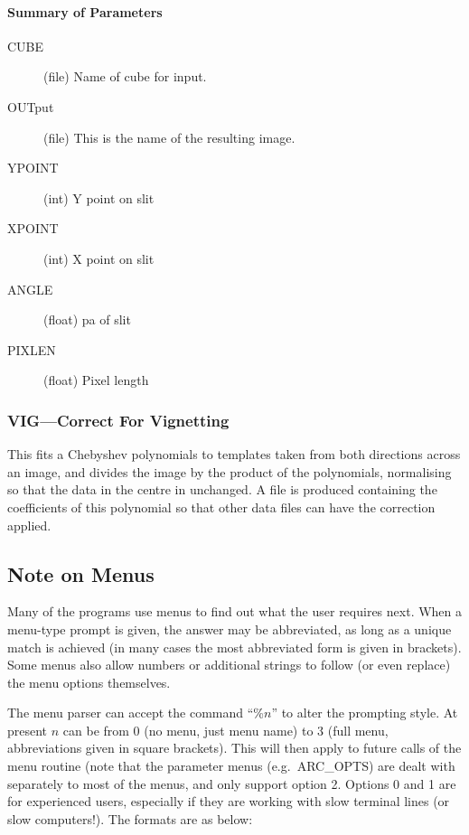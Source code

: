 \paragraph{Summary of Parameters}

\begin{description}
\item[CUBE] (file) Name of cube for input.
\item[OUTput] (file) This is the name of the resulting image.
\item[YPOINT] (int) Y point on slit
\item[XPOINT] (int) X point on slit
\item[ANGLE] (float) pa of slit
\item[PIXLEN] (float) Pixel length
\end{description}

\subsubsection{VIG---Correct For Vignetting}

This fits a Chebyshev polynomials to templates taken from both
directions across an image, and divides the image by the product of the
polynomials, normalising so that the data in the centre in unchanged.
A file is produced containing the coefficients of this polynomial so that
other data files can have the correction applied.

\clearpage

\subsection{\label{note_on_menus}Note on Menus}

Many of the programs use menus to find out what the user requires next.
When a menu-type prompt is given, the answer may be abbreviated, as long
as a unique match is achieved (in many cases the most abbreviated form
is given in brackets).
Some menus also allow numbers or additional strings to follow (or even
replace) the menu options themselves.

The menu parser can accept the command ``\%$n$'' to alter the prompting
style.
At present $n$ can be from 0 (no menu, just menu name) to 3 (full menu,
abbreviations given in square brackets).
This will then apply to future calls of the menu routine (note that the
parameter menus (e.g.\ ARC\_OPTS) are dealt with separately to most of
the menus, and only support option 2.
Options 0 and 1 are for experienced users, especially if they are
working with slow terminal lines (or slow computers!).
The formats are as below:

